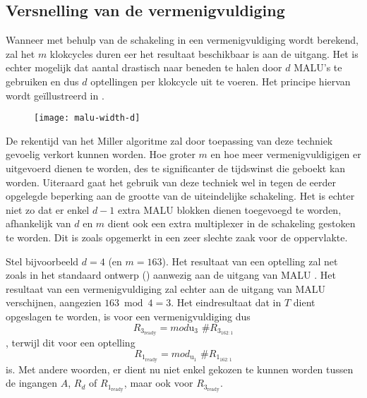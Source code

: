 \subsection{Versnelling van de vermenigvuldiging\label{subsectie-implementatie-gf2m-versnelling}}

Wanneer met behulp van de schakeling in  een vermenigvuldiging wordt berekend, zal het $m$ klokcycles duren eer het resultaat beschikbaar is aan de uitgang. Het is echter mogelijk dat aantal drastisch naar beneden te halen door $d$ MALU's te gebruiken en dus $d$ optellingen per klokcycle uit te voeren. Het principe hiervan wordt ge\"illustreerd in .

\begin{figure}[h]
	\centering
		\texttt{[image: malu-width-d]}
\end{figure}

De rekentijd van het Miller algoritme zal door toepassing van deze techniek gevoelig verkort kunnen worden. Hoe groter $m$ en hoe meer vermenigvuldigigen er uitgevoerd dienen te worden, des te significanter de tijdswinst die geboekt kan worden. Uiteraard gaat het gebruik van deze techniek wel in tegen de eerder opgelegde beperking aan de grootte van de uiteindelijke schakeling. Het is echter niet zo dat er enkel $d - 1$ extra MALU blokken dienen toegevoegd te worden, afhankelijk van $d$ en $m$ dient ook een extra multiplexer in de schakeling gestoken te worden. Dit is zoals opgemerkt in  een zeer slechte zaak voor de  oppervlakte.

Stel bijvoorbeeld $d = 4$ (en $m = 	163$). Het resultaat van een optelling zal net zoals in het standaard ontwerp () aanwezig aan de uitgang van MALU . Het resultaat van een vermenigvuldiging zal echter aan de uitgang van MALU  verschijnen, aangezien $163 \bmod 4 = 3$. Het eindresultaat dat in $T$ dient opgeslagen te worden, is voor een vermenigvuldiging dus
\[R_{3_{\text{ready}}} = mod{\text{u}_3} \text{ \# } R_{3_{162:1}}\]
, terwijl dit voor een optelling
\[R_{1_{\text{ready}}} = mod_{\text{u}_1} \text{ \# } R_{1_{162:1}}\]
is. Met andere woorden, er dient nu niet enkel gekozen te kunnen worden tussen de ingangen $A$, $R_d$ of $R_{1_{\text{ready}}}$, maar ook voor $R_{3_{\text{ready}}}$.

